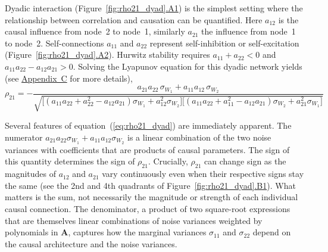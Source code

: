 \documentclass[12pt]{article}
\begin{document}
Dyadic interaction
(Figure~\ref{fig:rho21_dyad}\hyperref[fig:dyad_A1]{.A1}) is the simplest
setting where the relationship between correlation and causation can be
quantified. Here $a_{12}$ is the causal influence from node~2 to node~1,
similarly $a_{21}$ the influence from node~1 to node~2. Self-connections
$a_{11}$ and $a_{22}$ represent self-inhibition or self-excitation
(Figure~\ref{fig:rho21_dyad}\hyperref[fig:dyad_A2]{.A2}). Hurwitz
stability requires $a_{11}+a_{22}<0$ and $a_{11}a_{22}-a_{12}a_{21}>0$.
Solving the Lyapunov equation for this dyadic network yields (see
\hyperref[app:appC]{Appendix~C} for more details),
\begin{equation}
\rho_{21} = -\frac{
  a_{21}a_{22}\,\sigma_{W_1} + a_{11}a_{12}\,\sigma_{W_2}
}{
  \sqrt{\bigl[(a_{11}a_{22}+a_{22}^2-a_{12}a_{21})\sigma_{W_1}
              +a_{12}^2\sigma_{W_2}\bigr]
        \bigl[(a_{11}a_{22}+a_{11}^2-a_{12}a_{21})\sigma_{W_2}
              +a_{21}^2\sigma_{W_1}\bigr]}
}
\label{eq:rho21_dyad}
\end{equation}

Several features of equation~(\ref{eq:rho21_dyad}) are
immediately apparent.
The numerator $a_{21}a_{22}\sigma_{W_1}+a_{11}a_{12}\sigma_{W_2}$
is a linear combination of the two noise variances with
coefficients that are products of causal parameters. The sign
of this quantity determines the sign of $\rho_{21}$.
Crucially, $\rho_{21}$ can change sign as the magnitudes of $a_{12}$ and $a_{21}$ vary
continuously even when their respective signs stay the same (see the
2nd and 4th quadrants of Figure~\ref{fig:rho21_dyad}\hyperref[fig:dyad_B1]{.B1}). What matters is the sum, not necessarily the magnitude or strength of each individual
causal connection.
The denominator, a product of two square-root expressions
that are themselves linear combinations of noise variances
weighted by polynomials in $\mathbf{A}$, captures how the
marginal variances $\sigma_{11}$ and $\sigma_{22}$ depend on
the causal architecture and the noise variances.
\end{document}
